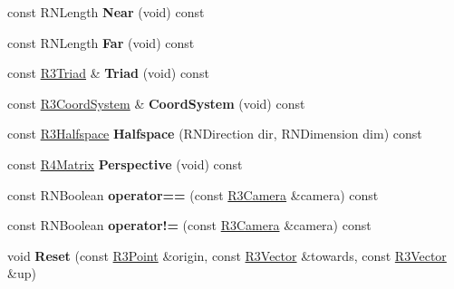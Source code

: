 \begin{DoxyCompactItemize}
\item 
const R\+N\+Length {\bfseries Near} (void) const \hypertarget{class_r3_camera_a38683212a50a5ec930fe8ab5929d4d1d}{}\label{class_r3_camera_a38683212a50a5ec930fe8ab5929d4d1d}

\item 
const R\+N\+Length {\bfseries Far} (void) const \hypertarget{class_r3_camera_a4d29c5d22c2e53e64b1a5e2dfc3f2007}{}\label{class_r3_camera_a4d29c5d22c2e53e64b1a5e2dfc3f2007}

\item 
const \hyperlink{class_r3_triad}{R3\+Triad} \& {\bfseries Triad} (void) const \hypertarget{class_r3_camera_a9e0f64d47aa006350219bcac2c0037f0}{}\label{class_r3_camera_a9e0f64d47aa006350219bcac2c0037f0}

\item 
const \hyperlink{class_r3_coord_system}{R3\+Coord\+System} \& {\bfseries Coord\+System} (void) const \hypertarget{class_r3_camera_a9576100d54078536e5867f31fd6e09d8}{}\label{class_r3_camera_a9576100d54078536e5867f31fd6e09d8}

\item 
const \hyperlink{class_r3_halfspace}{R3\+Halfspace} {\bfseries Halfspace} (R\+N\+Direction dir, R\+N\+Dimension dim) const \hypertarget{class_r3_camera_af482e53495748e51343fd1506eef4ef2}{}\label{class_r3_camera_af482e53495748e51343fd1506eef4ef2}

\item 
const \hyperlink{class_r4_matrix}{R4\+Matrix} {\bfseries Perspective} (void) const \hypertarget{class_r3_camera_a83e04168e3c3b9f771036c36a87acbc4}{}\label{class_r3_camera_a83e04168e3c3b9f771036c36a87acbc4}

\item 
const R\+N\+Boolean {\bfseries operator==} (const \hyperlink{class_r3_camera}{R3\+Camera} \&camera) const \hypertarget{class_r3_camera_ac1b333e66d5a4dddf4b1d342053f6cb3}{}\label{class_r3_camera_ac1b333e66d5a4dddf4b1d342053f6cb3}

\item 
const R\+N\+Boolean {\bfseries operator!=} (const \hyperlink{class_r3_camera}{R3\+Camera} \&camera) const \hypertarget{class_r3_camera_a195f5fa8a5695b95a035ef0ac6d5454c}{}\label{class_r3_camera_a195f5fa8a5695b95a035ef0ac6d5454c}

\item 
void {\bfseries Reset} (const \hyperlink{class_r3_point}{R3\+Point} \&origin, const \hyperlink{class_r3_vector}{R3\+Vector} \&towards, const \hyperlink{class_r3_vector}{R3\+Vector} \&up)\hypertarget{class_r3_camera_a9425169ee03f6e3ca852dc346284c1c9}{}\label{class_r3_camera_a9425169ee03f6e3ca852dc346284c1c9}


\end{DoxyCompactItemize}
